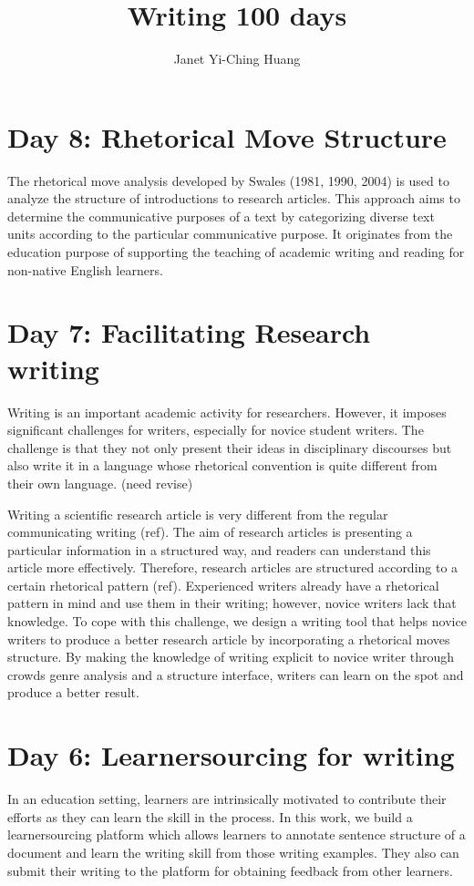 \documentclass[a4paper]{article}
\title{\textbf{Writing 100 days}}
\author{Janet Yi-Ching Huang}
\begin{document}
\maketitle
\section{Day 8: Rhetorical Move Structure}
The rhetorical move analysis developed by Swales (1981, 1990, 2004) is used to analyze the structure of introductions to research articles. This approach aims to determine the communicative purposes of a text by categorizing diverse text units according to the particular communicative purpose. It originates from the education purpose of supporting the teaching of academic writing and reading for non-native English learners.

\section{Day 7: Facilitating Research writing}
Writing is an important academic activity for researchers. However, it imposes significant challenges for writers, especially for novice student writers. The challenge is that they not only present their ideas in disciplinary discourses but also write it in a language whose rhetorical convention is quite different from their own language. (need revise)

Writing a scientific research article is very different from the regular communicating writing (ref). The aim of research articles is presenting a particular information in a structured way, and readers can understand this article more effectively. Therefore, research articles are structured according to a certain rhetorical pattern (ref). Experienced writers already have a rhetorical pattern in mind and use them in their writing; however, novice writers lack that knowledge. To cope with this challenge, we design a writing tool that helps novice writers to produce a better research article by incorporating a rhetorical moves structure. By making the knowledge of writing explicit to novice writer through crowds genre analysis and a structure interface, writers can learn on the spot and produce a better result. 

\section{Day 6: Learnersourcing for writing}
In an education setting, learners are intrinsically motivated to contribute their efforts as they can learn the skill in the process. In this work, we build a learnersourcing platform which allows learners to annotate sentence structure of a document and learn the writing skill from those writing examples. They also can submit their writing to the platform for obtaining feedback from other learners. 
\end{document}
